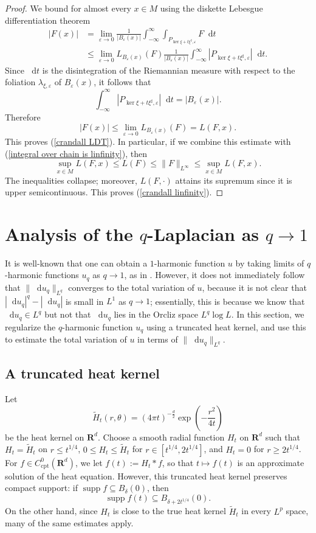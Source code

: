 \documentclass[reqno,11pt]{amsart}
\newcommand{\RR}{\mathbf{R}}
\newcommand*\dif{\mathop{}\!\mathrm{d}}
\DeclareMathOperator{\supp}{supp}
\newcommand{\cpt}{\mathrm{cpt}}
\theoremstyle{definition}
\numberwithin{equation}{section}
\begin{document}
\begin{proof}
We bound for almost every $x \in M$ using the diskette Lebesgue differentiation theorem
\begin{align*}
|F(x)|
&= \lim_{\varepsilon \to 0} \frac{1}{|B_\varepsilon(x)|} \int_{-\infty}^\infty \int_{P_{\ker \xi + t\xi^\sharp, \varepsilon}} F \dif t \\
&\leq \lim_{\varepsilon \to 0} L_{B_\varepsilon(x)}(F) \frac{1}{|B_\varepsilon(x)|} \int_{-\infty}^\infty |P_{\ker \xi + t\xi^\sharp, \varepsilon}| \dif t.
\end{align*}
Since $\dif t$ is the disintegration of the Riemannian measure with respect to the foliation $\lambda_{\xi, \varepsilon}$ of $B_\varepsilon(x)$,  it follows that 
$$\int_{-\infty}^\infty |P_{\ker \xi + t\xi^\sharp, \varepsilon}| \dif t = |B_\varepsilon(x)|.$$
Therefore
$$|F(x)| \leq \lim_{\varepsilon \to 0} L_{B_\varepsilon(x)}(F) = L(F, x).$$
This proves (\ref{crandall LDT}). In particular, if we combine this estimate with (\ref{integral over chain is linfinity}), then
$$\sup_{x \in M} L(F, x) \leq L(F) \leq \|F\|_{L^\infty} \leq \sup_{x \in M} L(F, x).$$
The inequalities collapse; moreover, $L(F, \cdot)$ attains its supremum since it is upper semicontinuous.
This proves (\ref{crandall linfinity}).
\end{proof}

\section{Analysis of the \texorpdfstring{$q$-Laplacian as $q \to 1$}{q-Laplacian}}
It is well-known that one can obtain a $1$-harmonic function $u$ by taking limits of $q$-harmonic functions $u_q$ as $q \to 1$, as in \cite{Mazon14}.
However, it does not immediately follow that $\|\dif u_q\|_{L^q}$ converges to the total variation of $u$, because it is not clear that $|\dif u_q|^q - |\dif u_q|$ is small in $L^1$ as $q \to 1$; essentially, this is because we know that $\dif u_q \in L^q$ but not that $\dif u_q$ lies in the Orcliz space $L^q \log L$.
In this section, we regularize the $q$-harmonic function $u_q$ using a truncated heat kernel, and use this to estimate the total variation of $u$ in terms of $\|\dif u_q\|_{L^q}$.

\subsection{A truncated heat kernel}
Let
$$\tilde H_t(r, \theta) = (4\pi t)^{-\frac{d}{2}} \exp\left(-\frac{r^2}{4t}\right)$$
be the heat kernel on $\RR^d$.
Choose a smooth radial function $H_t$ on $\RR^d$ such that $H_t = \tilde H_t$ on $r \leq t^{1/4}$, $0 \leq H_t \leq \tilde H_t$ for $r \in [t^{1/4}, 2t^{1/4}]$, and $H_t = 0$ for $r \geq 2 t^{1/4}$.
For $f \in C^0_\cpt(\RR^d)$, we let $f(t) := H_t * f$, so that $t \mapsto f(t)$ is an approximate solution of the heat equation.
However, this truncated heat kernel preserves compact support: if $\supp f \subseteq B_\delta(0)$, then
$$\supp f(t) \subseteq B_{\delta + 2t^{1/4}}(0).$$
On the other hand, since $H_t$ is close to the true heat kernel $\tilde H_t$ in every $L^p$ space, many of the same estimates apply.
\end{document}
